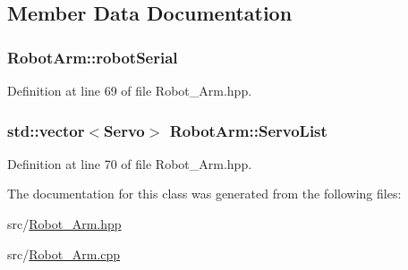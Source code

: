 \subsection{Member Data Documentation}
\subsubsection[{\texorpdfstring{robot\+Serial}{robotSerial}}]{ Robot\+Arm\+::robot\+Serial\hspace{0.3cm}{\ttfamily [private]}}\hypertarget{class_robot_arm_aa1be826408c3c876e2227095bba1cd17}{}\label{class_robot_arm_aa1be826408c3c876e2227095bba1cd17}


Definition at line 69 of file Robot\+\_\+\+Arm.\+hpp.

\subsubsection[{\texorpdfstring{Servo\+List}{ServoList}}]{\setlength{\rightskip}{0pt plus 5cm}std\+::vector$<${\bf Servo}$>$ Robot\+Arm\+::\+Servo\+List\hspace{0.3cm}{\ttfamily [private]}}\hypertarget{class_robot_arm_a2fd2d1c096f1b147b7882d7bfd202eaf}{}\label{class_robot_arm_a2fd2d1c096f1b147b7882d7bfd202eaf}


Definition at line 70 of file Robot\+\_\+\+Arm.\+hpp.



The documentation for this class was generated from the following files\+:\begin{DoxyCompactItemize}
\item 
src/\hyperlink{_robot___arm_8hpp}{Robot\+\_\+\+Arm.\+hpp}\item 
src/\hyperlink{_robot___arm_8cpp}{Robot\+\_\+\+Arm.\+cpp}\end{DoxyCompactItemize}
